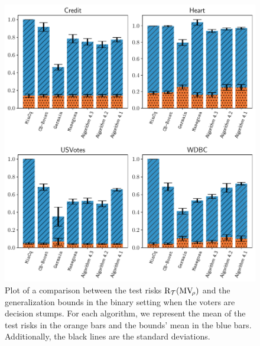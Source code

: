 \begin{figure}
    \centering
    \includegraphics[width=1.0\linewidth]{chapter_4/figures/stump_binary_1.pdf}
    \caption[Comparison Between the Test Risks and the Bounds (1/6)]{
    Plot of a comparison between the test risks $\text{R}_{\mathcal{T}}(\text{MV}_{\!\rho})$ and the generalization bounds in the binary setting when the voters are decision stumps.
    For each algorithm, we represent the mean of the test risks in the orange bars and the bounds' mean in the blue bars.
    Additionally, the black lines are the standard deviations. 
    }
    \label{chap:mv:fig:stump-binary-1}
\end{figure}

